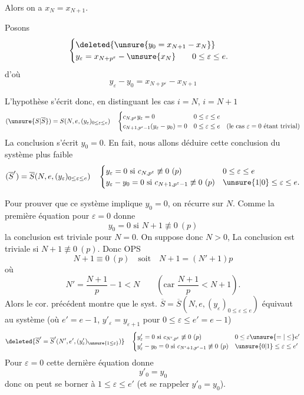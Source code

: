  Alors on a $x_N=x_{N+1}$.

 Posons
\[
\begin{cases}
\deleted{\unsure{y_0=x_{N+1}-x_N}}\\
y_\varepsilon=x_{N+p^\varepsilon}-\unsure{x_N}\qquad0\leq\varepsilon\leq e.
\end{cases}
\]
d'où
\[
y_\varepsilon-y_0=x_{N+p^\varepsilon}-x_{N+1}
\]

L'hypothèse s'écrit donc, en distinguant les cas $i=N$, $i=N+1$
\qquad{}
\[
(\unsure{S|\overline S})=S(N,e,(y_\varepsilon)_{0\leq\varepsilon\leq e})\quad
\begin{cases}
c_{N,p^\varepsilon}y_\varepsilon=0&0\leq\varepsilon\leq e\\
c_{N+1,p^\varepsilon-1}(y_\varepsilon-y_0)=0&0\leq\varepsilon\leq e\quad(\text{le cas }\varepsilon=0\text{ étant trivial})
\end{cases}
\]
La conclusion s'écrit $y_0=0$. En fait, nous allons déduire cette conclusion du système plus faible 
\[
(\overline S')=\overline S(N,e,(y_\varepsilon)_{0\leq\varepsilon\leq e})\quad
\begin{cases}
y_\varepsilon=0\text{ si }c_{N,p^\varepsilon}\not\equiv0\ (p)&0\leq\varepsilon\leq e\\
y_\varepsilon-y_0=0\text{ si }c_{N+1,p^\varepsilon-1}\not\equiv0\ (p)&\unsure{1|0}\leq\varepsilon\leq e.
\end{cases}
\]

Pour prouver que ce système implique $y_0=0$, on récurre sur $N$. Comme la première équation pour $\varepsilon=0$ donne
\[
y_0=0\text{ si }N+1\not\equiv0\ (p)
\]
la conclusion est triviale pour $N=0$.  On suppose donc $N>0$,  La conclusion est triviale si $N+1\not\equiv0\ (p)$.
Donc OPS
\[
N+1\equiv0\ (p)\quad\text{soit}\quad N+1=(N'+1)p
\]
où
\[
N'=\frac{N+1}{p}-1<N\qquad\left(\text{car }\frac{N+1}{p}<N+1\right).
\]
Alors le cor. précédent montre que le syst. $\overline S=\overline S(N,e,(y_\varepsilon)_{0\leq\varepsilon\leq e})$  équivaut au système (où $e'=e-1$, $y'_\varepsilon=y_{\varepsilon+1}$ pour $0\leq\varepsilon\leq e'=e-1$)
\[
\deleted{\overline S'=\overline S'(N',e',(y'_\varepsilon)_{\unsure{1\leq\varepsilon}})}\quad
\begin{cases}
y'_\varepsilon=0\text{ si }c_{N',p^\varepsilon}\not\equiv0\ (p)&0\leq\varepsilon\unsure{=|\leq}e'\\
y'_\varepsilon-y_0=0\text{ si }c_{N'+1,p^\varepsilon-1}\not\equiv0\ (p)&\unsure{0|1}\leq\varepsilon\leq e'
\end{cases}
\]
Pour $\varepsilon=0$ cette dernière équation donne 
\[
y'_0=y_0
\]
donc on peut se borner à $1\leq\varepsilon\leq e'$ (et se rappeler $y'_0=y_0$).


